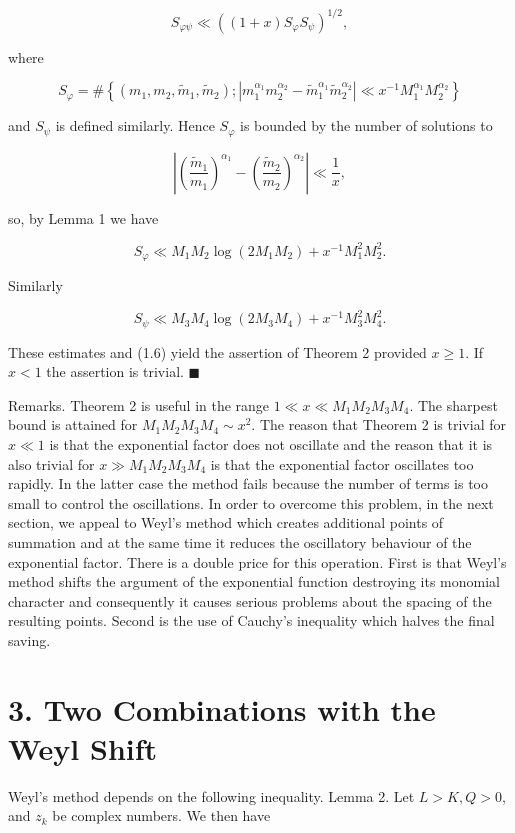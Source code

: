 \documentclass[10pt]{article}
\begin{document}
$$
S_{\varphi \psi} \ll\left((1+x) S_{\varphi} S_{\psi}\right)^{1 / 2},
$$

where

$$
S_{\varphi}=\#\left\{\left(m_{1}, m_{2}, \tilde{m}_{1}, \tilde{m}_{2}\right) ;\left|m_{1}^{\alpha_{1}} m_{2}^{\alpha_{2}}-\tilde{m}_{1}^{\alpha_{1}} \tilde{m}_{2}^{\alpha_{2}}\right| \ll x^{-1} M_{1}^{\alpha_{1}} M_{2}^{\alpha_{2}}\right\}
$$

and $S_{\psi}$ is defined similarly. Hence $S_{\varphi}$ is bounded by the number of solutions to

$$
\left|\left(\frac{\tilde{m}_{1}}{m_{1}}\right)^{\alpha_{1}}-\left(\frac{\tilde{m}_{2}}{m_{2}}\right)^{\alpha_{2}}\right| \ll \frac{1}{x},
$$

so, by Lemma 1 we have

$$
S_{\varphi} \ll M_{1} M_{2} \log\left(2 M_{1} M_{2}\right)+x^{-1} M_{1}^{2} M_{2}^{2} .
$$

Similarly

$$
S_{\psi} \ll M_{3} M_{4} \log\left(2 M_{3} M_{4}\right)+x^{-1} M_{3}^{2} M_{4}^{2} .
$$

These estimates and (1.6) yield the assertion of Theorem 2 provided $x \geqslant 1$. If $x<1$ the assertion is trivial. \(\blacksquare\)

Remarks. Theorem 2 is useful in the range $1 \ll x \ll M_{1} M_{2} M_{3} M_{4}$. The sharpest bound is attained for $M_{1} M_{2} M_{3} M_{4} \sim x^{2}$. The reason that Theorem 2 is trivial for $x \ll 1$ is that the exponential factor does not oscillate and the reason that it is also trivial for $x \gg M_{1} M_{2} M_{3} M_{4}$ is that the exponential factor oscillates too rapidly. In the latter case the method fails because the number of terms is too small to control the oscillations. In order to overcome this problem, in the next section, we appeal to Weyl's method which creates additional points of summation and at the same time it reduces the oscillatory behaviour of the exponential factor. There is a double price for this operation. First is that Weyl's method shifts the argument of the exponential function destroying its monomial character and consequently it causes serious problems about the spacing of the resulting points. Second is the use of Cauchy's inequality which halves the final saving.

\section*{3. Two Combinations with the Weyl Shift}
Weyl's method depends on the following inequality.
Lemma 2. Let $L>K, Q>0$, and $z_{k}$ be complex numbers. We then have
\end{document}
